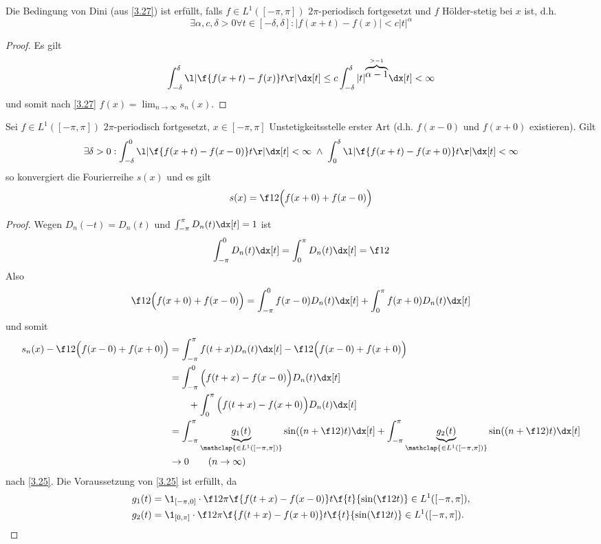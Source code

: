 \begin{nt} \label{3.28}
	Die Bedingung von Dini (aus \ref{3.27}) ist erfüllt, falls $f \in L^1([-\pi,\pi])$ $2\pi$-periodisch fortgesetzt und $f$ Hölder-stetig bei $x$ ist, d.h.
	\[
		\exists \alpha, c, \delta > 0 \forall t \in [-\delta, \delta] : |f(x+t) - f(x)| < c |t|^\alpha
	\]
	\begin{proof}
		Es gilt
		\[
			\int_{-\delta}^{\delta} \l| \f{f(x+t) - f(x)}t \r| \dx[t] 
			\le c \int_{-\delta}^\delta |t|^{\overbrace{\alpha - 1}^{>-1}} \dx[t]
			< \infty
		\]
		und somit nach \ref{3.27} $f(x) = \lim_{n\to\infty} s_n(x)$.
	\end{proof}
\end{nt}

\begin{st} \label{3.29}
	Sei $f \in L^1([-\pi,\pi])$ $2\pi$-periodisch fortgesetzt, $x \in [-\pi,\pi]$ Unstetigkeitsstelle erster Art (d.h. $f(x-0)$ und $f(x+0)$ existieren).
	Gilt
	\[
		\exists \delta > 0 :
		\int_{-\delta}^0 \l| \f{f(x+t)-f(x-0)}t \r| \dx[t] < \infty
		\;\land\; \int_{0}^{\delta} \l| \f{f(x+t)-f(x+0)}t \r| \dx[t] < \infty
	\]
	so konvergiert die Fourierreihe $s(x)$ und es gilt
	\[
		s(x) = \f 12 \Big( f(x+0) + f(x-0) \Big)
	\]
	\begin{proof}
		Wegen $D_n(-t) = D_n(t)$ und $\int_{-\pi}^\pi D_n(t) \dx[t] = 1$ ist
		\[
			\int_{-\pi}^0 D_n(t) \dx[t] = \int_0^\pi D_n(t) \dx[t] = \f 12
		\]
		Also
		\[
			\f 12 \Big(f(x+0) + f(x-0) \Big) = \int_{-\pi}^0 f(x-0) D_n(t) \dx[t] + \int_{0}^\pi f(x+0) D_n(t) \dx[t]
		\]
		und somit
		\begin{align*}
			s_n(x) - \f 12 \Big( f(x-0) + f(x+0)\Big)
			&= \int_{-\pi}^\pi f(t+x) D_n(t) \dx[t] - \f 12 \Big( f(x-0) + f(x+0)\Big) \\
			&= \int_{-\pi}^0 \Big( f(t+x) - f(x-0) \Big) D_n(t) \dx[t] \\
				&\qquad+ \int_{0}^\pi \Big( f(t+x) - f(x+0) \Big) D_n(t) \dx[t] \\
			&= \int_{-\pi}^\pi \underbrace{g_1(t)}_{\mathclap{\in L^1([-\pi,\pi])}} \sin((n+\f 12)t) \dx[t]
			+ \int_{-\pi}^\pi \underbrace{g_2(t)}_{\mathclap{\in L^1([-\pi,\pi])}} \sin((n+\f 12)t) \dx[t] \\
			&\to 0 \qquad (n\to \infty)
		\end{align*}
		nach \ref{3.25}. Die Voraussetzung von \ref{3.25} ist erfüllt, da
		\begin{align*}
			g_1(t) &= \1_{[-\pi,0]} \cdot \f 1{2\pi} \f {f(t+x) - f(x-0)}t  \f {t}{\sin (\f 12 t)} \in L^1([-\pi,\pi]), \\
			g_2(t) &= \1_{[0,\pi]} \cdot \f 1{2\pi} \f {f(t+x) - f(x+0)}t  \f {t}{\sin (\f 12 t)} \in L^1([-\pi,\pi]).
		\end{align*}

	\end{proof}
\end{st}

